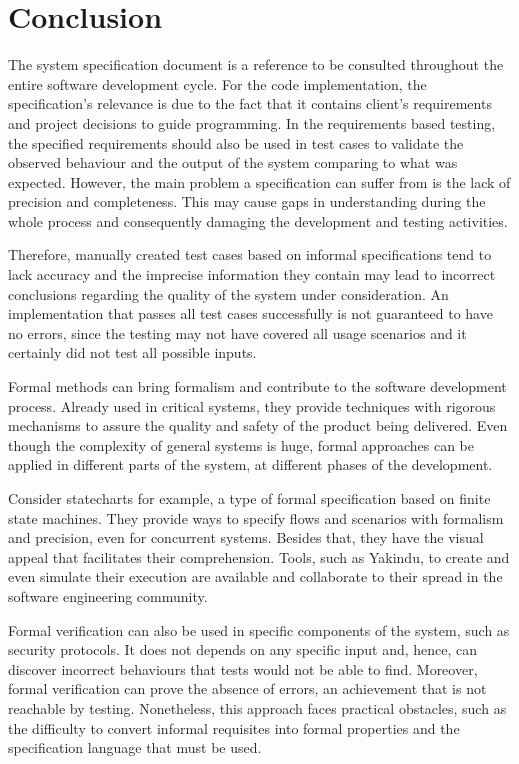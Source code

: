 \chapter{Conclusion}
\label{cap:conclusoes}

The system specification document is a reference to be consulted throughout the entire software development cycle. For the code implementation, the specification's relevance is due to the fact that it contains client's requirements and project decisions to guide programming. In the requirements based testing, the specified requirements should also be used in test cases to validate the observed behaviour and the output of the system comparing to what was expected. However, the main problem a specification can suffer from is the lack of precision and completeness. This may cause gaps in understanding during the whole process and consequently damaging the development and testing activities.

Therefore, manually created test cases based on informal specifications tend to lack accuracy and the imprecise information they contain may lead to incorrect conclusions regarding the quality of the system under consideration. An implementation that passes all test cases successfully is not guaranteed to have no errors, since the testing may not have covered all usage scenarios and it certainly did not test all possible inputs.

Formal methods can bring formalism and contribute to the software development process. Already used in critical systems, they provide techniques with rigorous mechanisms to assure the quality and safety of the product being delivered. Even though the complexity of general systems is huge, formal approaches can be applied in different parts of  the system, at different phases of the development.

Consider statecharts for example, a type of formal specification based on finite state machines. They provide ways to specify flows and scenarios with formalism and precision, even for concurrent systems. Besides that, they have the visual appeal that facilitates their comprehension. Tools, such as Yakindu, to create and even simulate their execution are available and collaborate to their spread in the software engineering community.

Formal verification can also be used in specific components of the system, such as security protocols. It does not depends on any specific input and, hence, can discover incorrect behaviours that tests would not be able to find. Moreover, formal verification can prove the absence of errors, an achievement that is not reachable by testing. Nonetheless, this approach faces practical obstacles, such as the difficulty to convert informal requisites into formal properties and the specification language that must be used.


